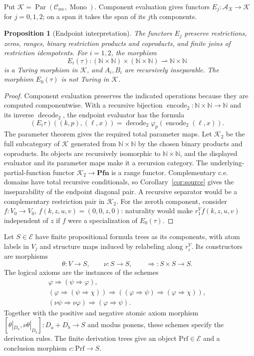 \documentclass[11pt]{article}
\newtheorem{proposition}[theorem]{Proposition}
\theoremstyle{definition}\newtheorem{definition}[theorem]{Definition}
\newcommand{\N}{\mathbb N}
\newcommand{\Pfn}{\mathbf{Pfn}}
\newcommand{\Par}{\operatorname{Par}}
\newcommand{\A}{\mathcal A}
\newcommand{\E}{\mathcal E}
\begin{document}
Put $\mathcal K=\Par(\mathcal C_{\mathrm{rec}},\operatorname{Mono})$.
Component evaluation gives functors
$E_j:\A_X\to\mathcal K$ for $j=0,1,2$; on a span it takes
the span of its $j$th components.

\begin{proposition}[Endpoint interpretation]\label{prop:fork-endpoints}
The functors $E_j$ preserve restrictions, zeros, ranges, binary
restriction products and coproducts, and finite joins of restriction
idempotents. For $i=1,2$, the morphism
\[
 E_i(\tau):(\N\times\N)\times(\N\times\N)
                  \rightharpoonup\N\times\N
\]
is a Turing morphism in $\mathcal K$, and $A_i,B_i$ are recursively
inseparable. The morphism $E_0(\tau)$ is not Turing in $\mathcal K$.
\end{proposition}
\begin{proof}
Component evaluation preserves the indicated operations because
they are computed componentwise. With a recursive bijection
$\operatorname{encode}_2:\N\times\N\to\N$ and its inverse
$\operatorname{decode}_2$, the endpoint evaluator has the formula
\[
 (E_i\tau)((k,p),(\ell,x))
 =\operatorname{decode}_2\varphi_p(\operatorname{encode}_2(\ell,x)).
\]
The parameter theorem gives the required total parameter maps.
Let $\mathcal K_2$ be the full subcategory of
$\mathcal K$ generated from $\N\times\N$ by the chosen binary
products and coproducts. Its objects are recursively isomorphic to
$\N\times\N$, and the displayed evaluator and its parameter maps
make it a recursion category. The underlying-partial-function
functor $\mathcal K_2\to\Pfn$ is a range functor.
Complementary c.e. domains have total recursive conditionals, so
Corollary~\ref{cor:source} gives the inseparability of the endpoint
diagonal pair. A recursive separator would be a complementary
restriction pair in $\mathcal K_2$.
For the zeroth component, consider
$f:V_0\to V_0$, $f(k,z,u,v)=(0,0,z,0)$: naturality would make
$r_1^Vf(k,z,u,v)$
independent of $z$ if $f$ were a specialization of $E_0(\tau)$.
\end{proof}

Let $S\in\E$ have finite propositional formula trees as its
components, with atom labels in $V_j$ and structure maps induced
by relabeling along $r_i^V$. Its constructors are morphisms
\[
 \theta:V\to S,\qquad \nu:S\to S,
 \qquad {\Rightarrow}:S\times S\to S.
\]
The logical axioms are the instances of the schemes
\[
 \begin{gathered}
 \varphi\Rightarrow(\psi\Rightarrow\varphi),\\
 (\varphi\Rightarrow(\psi\Rightarrow\chi))
 \Rightarrow((\varphi\Rightarrow\psi)\Rightarrow(\varphi\Rightarrow\chi)),\\
 (\nu\psi\Rightarrow\nu\varphi)\Rightarrow(\varphi\Rightarrow\psi).
 \end{gathered}
\]
Together with the positive and negative atomic axiom morphism
$[\theta|_{D_a},\nu\theta|_{D_b}]:D_a+D_b\to S$ and modus ponens,
these schemes specify the derivation rules. The finite derivation
trees give an object $\mathrm{Prf}\in\E$
and a conclusion morphism $c:\mathrm{Prf}\to S$.
\end{document}
